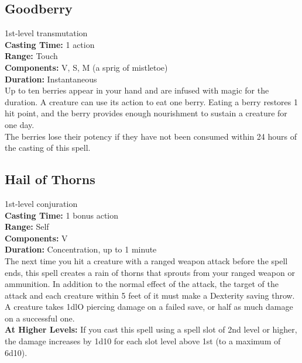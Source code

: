 \documentclass[11pt, A4paper, english]{article}
\begin{document}
		\subsection{Goodberry}
1st-level transmutation \\
\textbf{Casting Time:} 1 action \\
\textbf{Range:} Touch \\
\textbf{Components:} V, S, M (a sprig of mistletoe) \\
\textbf{Duration:} Instantaneous \\
Up to ten berries appear in your hand and are infused with magic for the duration. A creature can use its action to eat one berry. Eating a berry restores 1 hit point, and the berry provides enough nourishment to sustain a creature for one day. \\
The berries lose their potency if they have not been consumed within 24 hours of the casting of this spell.

		\subsection{Hail of Thorns}
1st-level conjuration \\
\textbf{Casting Time:} 1 bonus action \\
\textbf{Range:} Self \\
\textbf{Components:} V \\
\textbf{Duration:} Concentration, up to 1 minute \\
The next time you hit a creature with a ranged weapon attack before the spell ends, this spell creates a rain of thorns that sprouts from your ranged weapon or ammunition. In addition to the normal effect of the attack, the target of the attack and each creature within 5 feet of it must make a Dexterity saving throw. A creature takes 1dlO piercing damage on a failed save, or half as much damage on a successful one. \\
\textbf{At Higher Levels:} If you cast this spell using a spell slot of 2nd level or higher, the damage increases by 1d10 for each slot level above 1st (to a maximum of 6d10).
\end{document}
